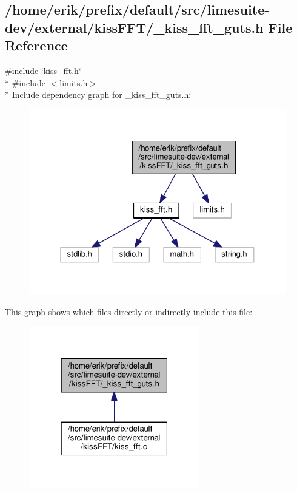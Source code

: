 \subsection{/home/erik/prefix/default/src/limesuite-\/dev/external/kiss\+F\+F\+T/\+\_\+kiss\+\_\+fft\+\_\+guts.h File Reference}
\label{__kiss__fft__guts_8h}
{\ttfamily \#include \char`\"{}kiss\+\_\+fft.\+h\char`\"{}}\\*
{\ttfamily \#include $<$limits.\+h$>$}\\*
Include dependency graph for \+\_\+kiss\+\_\+fft\+\_\+guts.\+h\+:
\nopagebreak
\begin{figure}[H]
\begin{center}
\leavevmode
\includegraphics[width=325pt]{d7/d43/__kiss__fft__guts_8h__incl}
\end{center}
\end{figure}
This graph shows which files directly or indirectly include this file\+:
\nopagebreak
\begin{figure}[H]
\begin{center}
\leavevmode
\includegraphics[width=211pt]{d5/d6b/__kiss__fft__guts_8h__dep__incl}
\end{center}
\end{figure}
